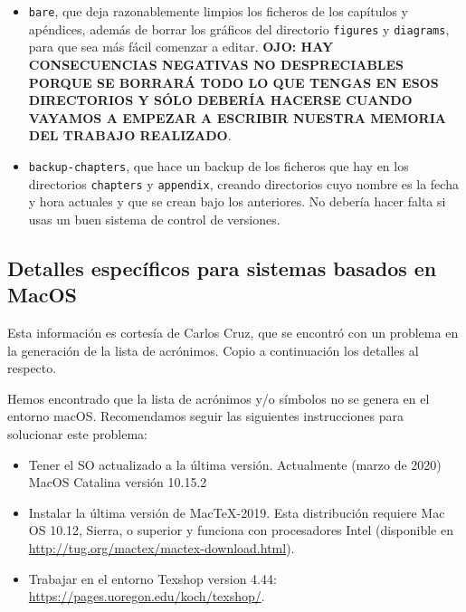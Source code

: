 \documentclass[spanish,openright]{book}
\begin{document}
\begin{itemize}
\begin{itemize}
  \item \texttt{bare}, que deja razonablemente limpios los ficheros de
    los capítulos y apéndices, además de borrar los gráficos del
    directorio \texttt{figures} y \texttt{diagrams}, para que sea más
    fácil comenzar a editar. \textbf{OJO: HAY CONSECUENCIAS NEGATIVAS NO
      DESPRECIABLES PORQUE SE BORRARÁ TODO LO QUE TENGAS EN ESOS
      DIRECTORIOS Y SÓLO DEBERÍA HACERSE CUANDO VAYAMOS A EMPEZAR A
      ESCRIBIR NUESTRA MEMORIA DEL TRABAJO REALIZADO}.

  \item \texttt{backup-chapters}, que hace un backup de los ficheros que
    hay en los directorios \texttt{chapters} y \texttt{appendix},
    creando directorios cuyo nombre es la fecha y hora actuales y que se
    crean bajo los anteriores. No debería hacer falta si usas un buen
    sistema de control de versiones.
  \end{itemize}

\end{itemize}


\subsection{Detalles específicos para sistemas basados en MacOS}
\label{sec:detall-espec-para}

Esta información es cortesía de Carlos Cruz, que se encontró con un
problema en la generación de la lista de acrónimos. Copio a
continuación los detalles al respecto.

Hemos encontrado que la lista de acrónimos y/o símbolos no se genera en
el entorno macOS. Recomendamos seguir las siguientes instrucciones para
solucionar este problema:

\begin{itemize}
\item Tener el SO actualizado a la última versión. Actualmente (marzo de
  2020) MacOS Catalina versión 10.15.2
\item Instalar la última versión de MacTeX-2019. Esta distribución
  requiere Mac OS 10.12, Sierra, o superior y funciona con procesadores
  Intel (disponible en
  \href{http://tug.org/mactex/mactex-download.html}{http://tug.org/mactex/mactex-download.html}).
\item Trabajar en el entorno Texshop version 4.44:
  \href{https://pages.uoregon.edu/koch/texshop/}{https://pages.uoregon.edu/koch/texshop/}.
\end{itemize}
\end{document}
